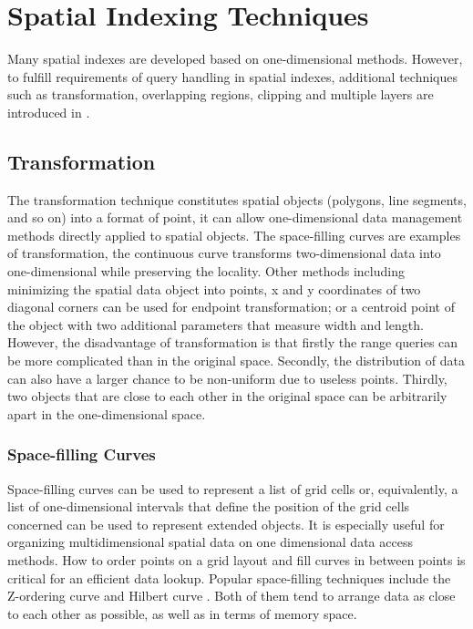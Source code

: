 \section{Spatial Indexing Techniques}
Many spatial indexes are developed based on one-dimensional methods. However, to fulfill requirements of query handling in spatial indexes, additional techniques such as transformation, overlapping regions, clipping and multiple layers are introduced in \cite{Faloutsos:1991ue}. 


\subsection{Transformation} \label{Transformation}
The transformation technique constitutes spatial objects (polygons, line segments, and so on) into a format of point, it can allow one-dimensional data management methods directly applied to spatial objects. The space-filling curves are examples of transformation, the continuous curve transforms two-dimensional data into one-dimensional while preserving the locality. Other methods including minimizing the spatial data object into points, x and y coordinates of two diagonal corners can be used for endpoint transformation; or a centroid point of the object with two additional parameters that measure width and length. However, the disadvantage of transformation is that firstly the range queries can be more complicated than in the original space. Secondly, the distribution of data can also have a larger chance to be non-uniform due to useless points. Thirdly, two objects that are close to each other in the original space can be arbitrarily apart in the one-dimensional space.  

\subsubsection{Space-filling Curves}
Space-filling curves can be used to represent a list of grid cells or, equivalently, a list of one-dimensional intervals that define the position of the grid cells concerned can be used to represent extended objects. It is especially useful for organizing multidimensional spatial data on one dimensional data access methods. How to order points on a grid layout and fill curves in between points is critical for an efficient data lookup. Popular space-filling techniques include the Z-ordering curve \cite{Orenstein:1984jq} and Hilbert curve \cite{Kamel:1994ux}. Both of them tend to arrange data as close to each other as possible, as well as in terms of memory space.

